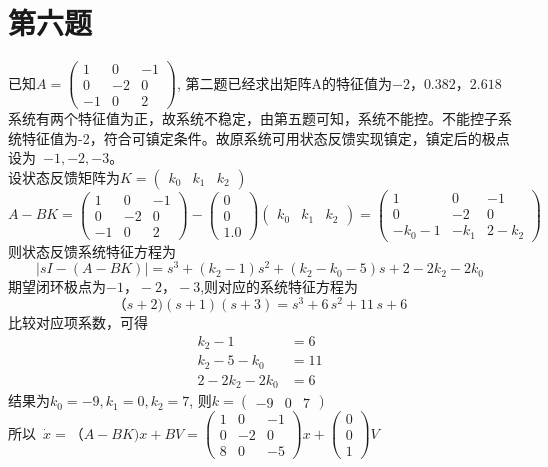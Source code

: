 \documentclass[a4paper]{article}
\begin{document}
\section*{第六题}
已知$A=\left(\begin{array}{ccc} 1 & 0 & -1\\ 0 & -2 & 0\\ -1 & 0 & 2 \end{array}\right)$, 第二题已经求出矩阵A的特征值为$ -2， 0.382， 2.618$ \\
系统有两个特征值为正，故系统不稳定，由第五题可知，系统不能控。不能控子系统特征值为-2，符合可镇定条件。\mbox{故原系统可用状态反馈实现镇定，镇定后的极点设为 }$ -1,-2,-3 $。 \\
设状态反馈矩阵为$K=\left(\begin{array}{ccc} k_0 & k_1 & k_2 \end{array}\right)$ \\
$$ A-BK=\left(\begin{array}{ccc} 1 & 0 & -1\\ 0 & -2 & 0\\ -1 & 0 & 2 \end{array}\right)-
\left(\begin{array}{c} 0\\ 0\\ 1.0 \end{array}\right)
\left(\begin{array}{ccc} k_0 & k_1 & k_2 \end{array}\right)=\left(\begin{array}{ccc} 1 & 0 & -1\\ 0 & -2 & 0\\  - k_0 - 1 & -k_1 & 2 - k_2 \end{array}\right) $$
则状态反馈系统特征方程为
$$ \left|sI-(A-BK)\right|= s^3+(k_2-1)s^2+(k_2-k_0-5)s+2-2k_2-2k_0$$ 
期望闭环极点为$-1，-2，-3$,则对应的系统特征方程为
$$ （s+2)(s+1)(s+3)=s^3 + 6\, s^2 + 11\, s + 6 $$ 
比较对应项系数，可得 
\begin{align*}
k_2-1 &= 6 \\
k_2-5-k_0 &=11 \\
2-2k_2-2k_0 &=6
\end{align*}
结果为$k_0=-9,k_1=0,k_2=7$, 则$ k=\left(\begin{array}{ccc} -9 & 0 & 7 \end{array}\right) $ \\
\mbox{所以 }$\dot{x}=（A-BK)x+BV=\left(\begin{array}{ccc} 1 & 0 & -1\\ 0 & -2 & 0\\ 8 & 0 & -5 \end{array}\right)x+\left(\begin{array}{c} 0\\ 0\\ 1 \end{array}\right)V$ \\
\end{document}
